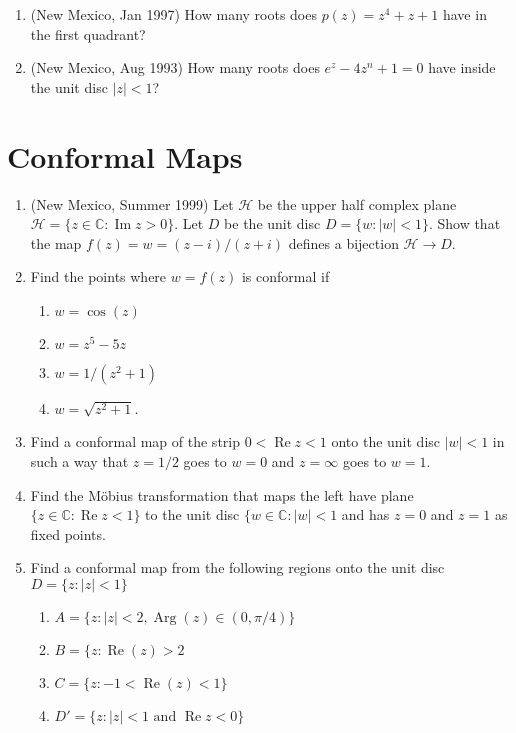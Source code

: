 \documentclass[a4paper,10pt]{article}
\newcommand{\CC}{\mathbb{C}}
\newcommand{\Arg}{\operatorname{Arg}}
\renewcommand{\Re}{\operatorname{Re}}
\renewcommand{\Im}{\operatorname{Im}}
\begin{document}
\begin{enumerate}
	
	\item (New Mexico, Jan 1997) How many roots does $p(z) = z^4 + z + 1$ have in the first quadrant?
	
	\item (New Mexico, Aug 1993)
	How many roots does $e^z - 4z^n +1 =0$ have inside the unit disc $\vert z \vert < 1$?
	
\end{enumerate}


\section{Conformal Maps}
\begin{enumerate}
\item (New Mexico, Summer 1999)
Let $\mathcal{H}$ be the upper half complex plane $\mathcal{H} = \lbrace z \in \CC : \Im z > 0 \rbrace$.
Let $D$ be the unit disc $D = \lbrace w : \vert w \vert < 1 \rbrace$. 
Show that the map $f(z) = w = (z-i)/(z+i)$ defines a bijection $\mathcal{H} \to D$.
	
	
\item Find the points where $w = f(z)$ is conformal if 
\begin{enumerate}
	\item $w = \cos(z)$
	\item $w = z^5 - 5z$
	\item $w = 1/(z^2+1)$
	\item $w = \sqrt{z^2+1}$.
\end{enumerate}

\item Find a conformal map of the strip $0 < \Re z < 1$ onto the unit disc $\vert w \vert < 1$ in such a way that $z=1/2 $ goes to $ w=0$ and $z = \infty$ goes to $w=1$.

\item Find the M\"obius transformation that maps the left have plane $\lbrace z \in \CC: \Re z < 1 \rbrace$ to the unit disc $\lbrace w \in \CC : \vert w \vert < 1$ and has $z=0$ and $z=1$ as fixed points.

\item Find a conformal map from the following regions onto the unit disc $D = \lbrace z : \vert z \vert < 1 \rbrace$
\begin{enumerate}
	\item $A = \lbrace z: \vert z \vert < 2,  \Arg(z) \in (0,\pi/4) \rbrace $
	\item $B = \lbrace z: \Re(z) >2 $
	\item $C = \lbrace z: -1<\Re(z)<1 \rbrace$
	\item $D' = \lbrace z: \vert z \vert < 1 \mbox{ and } \Re z < 0\rbrace $ 
\end{enumerate}


\end{enumerate}
\end{document}
